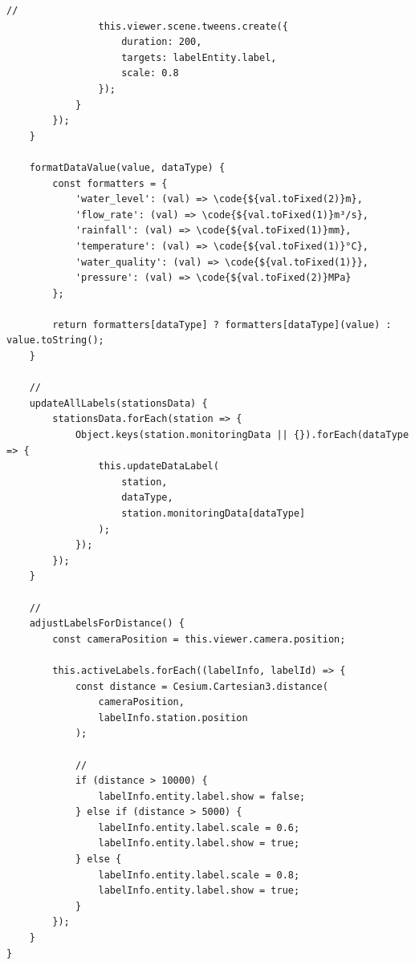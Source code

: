 \begin{lstlisting}[style=javascript]
                // 
                this.viewer.scene.tweens.create({
                    duration: 200,
                    targets: labelEntity.label,
                    scale: 0.8
                });
            }
        });
    }
    
    formatDataValue(value, dataType) {
        const formatters = {
            'water_level': (val) => \code{${val.toFixed(2)}m},
            'flow_rate': (val) => \code{${val.toFixed(1)}m³/s},
            'rainfall': (val) => \code{${val.toFixed(1)}mm},
            'temperature': (val) => \code{${val.toFixed(1)}°C},
            'water_quality': (val) => \code{${val.toFixed(1)}},
            'pressure': (val) => \code{${val.toFixed(2)}MPa}
        };
        
        return formatters[dataType] ? formatters[dataType](value) : value.toString();
    }
    
    // 
    updateAllLabels(stationsData) {
        stationsData.forEach(station => {
            Object.keys(station.monitoringData || {}).forEach(dataType => {
                this.updateDataLabel(
                    station,
                    dataType,
                    station.monitoringData[dataType]
                );
            });
        });
    }
    
    // 
    adjustLabelsForDistance() {
        const cameraPosition = this.viewer.camera.position;
        
        this.activeLabels.forEach((labelInfo, labelId) => {
            const distance = Cesium.Cartesian3.distance(
                cameraPosition,
                labelInfo.station.position
            );
            
            // 
            if (distance > 10000) {
                labelInfo.entity.label.show = false;
            } else if (distance > 5000) {
                labelInfo.entity.label.scale = 0.6;
                labelInfo.entity.label.show = true;
            } else {
                labelInfo.entity.label.scale = 0.8;
                labelInfo.entity.label.show = true;
            }
        });
    }
}
\end{lstlisting}

\hypertarget{section-154}{%
\subsubsection{}\label{section-154}}

\hypertarget{section-155}{%
\paragraph{}\label{section-155}}

